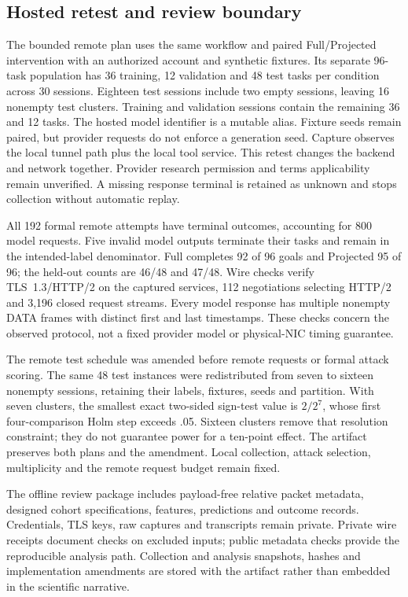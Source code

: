 \subsection{Hosted retest and review boundary}
The bounded remote plan uses the same workflow and paired Full/Projected intervention with an authorized account and synthetic fixtures. Its separate 96-task population has 36 training, 12 validation and 48 test tasks per condition across 30 sessions. Eighteen test sessions include two empty sessions, leaving 16 nonempty test clusters. Training and validation sessions contain the remaining 36 and 12 tasks. The hosted model identifier is a mutable alias. Fixture seeds remain paired, but provider requests do not enforce a generation seed. Capture observes the local tunnel path plus the local tool service. This retest changes the backend and network together. Provider research permission and terms applicability remain unverified. A missing response terminal is retained as unknown and stops collection without automatic replay.

All 192 formal remote attempts have terminal outcomes, accounting for 800 model requests. Five invalid model outputs terminate their tasks and remain in the intended-label denominator. Full completes 92 of 96 goals and Projected 95 of 96; the held-out counts are 46/48 and 47/48. Wire checks verify TLS~1.3/HTTP/2 on the captured services, 112 negotiations selecting HTTP/2 and 3,196 closed request streams. Every model response has multiple nonempty DATA frames with distinct first and last timestamps. These checks concern the observed protocol, not a fixed provider model or physical-NIC timing guarantee.

The remote test schedule was amended before remote requests or formal attack scoring. The same 48 test instances were redistributed from seven to sixteen nonempty sessions, retaining their labels, fixtures, seeds and partition. With seven clusters, the smallest exact two-sided sign-test value is $2/2^7$, whose first four-comparison Holm step exceeds .05. Sixteen clusters remove that resolution constraint; they do not guarantee power for a ten-point effect. The artifact preserves both plans and the amendment. Local collection, attack selection, multiplicity and the remote request budget remain fixed.

The offline review package includes payload-free relative packet metadata, designed cohort specifications, features, predictions and outcome records. Credentials, TLS keys, raw captures and transcripts remain private. Private wire receipts document checks on excluded inputs; public metadata checks provide the reproducible analysis path. Collection and analysis snapshots, hashes and implementation amendments are stored with the artifact rather than embedded in the scientific narrative.

